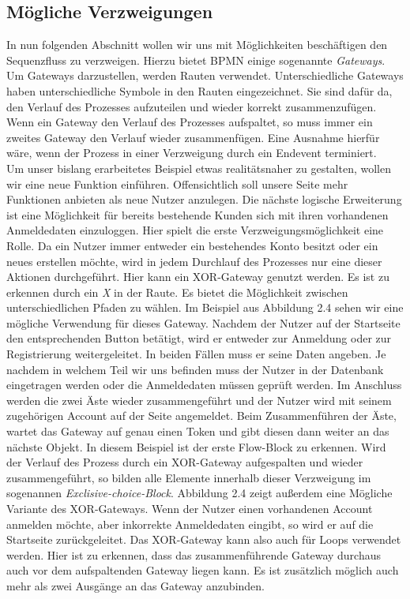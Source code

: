 \subsection{Mögliche Verzweigungen}
In nun folgenden Abschnitt wollen wir uns mit Möglichkeiten beschäftigen den Sequenzfluss zu verzweigen. Hierzu bietet BPMN einige sogenannte \textit{Gateways}. Um Gateways darzustellen, werden Rauten verwendet. Unterschiedliche Gateways haben unterschiedliche Symbole in den Rauten eingezeichnet. Sie sind dafür da, den Verlauf des Prozesses aufzuteilen und wieder korrekt zusammenzufügen. Wenn ein Gateway den Verlauf des Prozesses aufspaltet, so muss immer ein zweites Gateway den Verlauf wieder zusammenfügen. Eine Ausnahme hierfür wäre, wenn der Prozess in einer Verzweigung durch ein Endevent terminiert.\\
Um unser bislang erarbeitetes Beispiel etwas realitätsnaher zu gestalten, wollen wir eine neue Funktion einführen. Offensichtlich soll unsere Seite mehr Funktionen anbieten als neue Nutzer anzulegen. Die nächste logische Erweiterung ist eine Möglichkeit für bereits bestehende Kunden sich mit ihren vorhandenen Anmeldedaten einzuloggen. Hier spielt die erste Verzweigungsmöglichkeit eine Rolle. Da ein Nutzer immer entweder ein bestehendes Konto besitzt oder ein neues erstellen möchte, wird in jedem Durchlauf des Prozesses nur eine dieser Aktionen durchgeführt. Hier kann ein XOR-Gateway genutzt werden. Es ist zu erkennen durch ein \textit{X} in der Raute. Es bietet die Möglichkeit zwischen unterschiedlichen Pfaden zu wählen. Im Beispiel aus Abbildung 2.4 sehen wir eine mögliche Verwendung für dieses Gateway. Nachdem der Nutzer auf der Startseite den entsprechenden Button betätigt, wird er entweder zur Anmeldung oder zur Registrierung weitergeleitet. In beiden Fällen muss er seine Daten angeben. Je nachdem in welchem Teil wir uns befinden muss der Nutzer in der Datenbank eingetragen werden oder die Anmeldedaten müssen geprüft werden. Im Anschluss werden die zwei Äste wieder zusammengeführt und der Nutzer wird mit seinem zugehörigen Account auf der Seite angemeldet. Beim Zusammenführen der Äste, wartet das Gateway auf genau einen Token und gibt diesen dann weiter an das nächste Objekt. In diesem Beispiel ist der erste Flow-Block zu erkennen. Wird der Verlauf des Prozess durch ein XOR-Gateway aufgespalten und wieder zusammengeführt, so bilden alle Elemente innerhalb dieser Verzweigung im sogenannen \textit{Exclisive-choice-Block}. Abbildung 2.4 zeigt außerdem eine Mögliche Variante des XOR-Gateways. Wenn der Nutzer einen vorhandenen Account anmelden möchte, aber inkorrekte Anmeldedaten eingibt, so wird er auf die Startseite zurückgeleitet. Das XOR-Gateway kann also auch für Loops verwendet werden. Hier ist zu erkennen, dass das zusammenführende Gateway durchaus auch vor dem aufspaltenden Gateway liegen kann. Es ist zusätzlich möglich auch mehr als zwei Ausgänge an das Gateway anzubinden.\\
